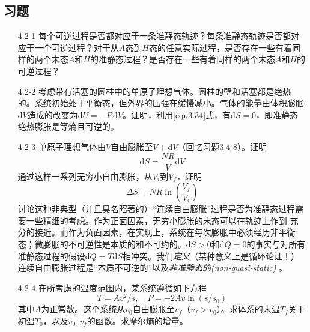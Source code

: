\subsection*{习题}
\begin{itemize}
\item[4.2-1] 每个可逆过程是否都对应于一条准静态轨迹？每条准静态轨迹是否都对应于一个可逆过程？对于从$A$态到$H$态的任意实际过程，是否存在一些有着同样的两个末态$A$和$H$的准静态过程？是否存在一些有着同样的两个末态$A$和$H$的可逆过程？
\item[4.2-2] 考虑带有活塞的圆柱中的单原子理想气体。圆柱的壁和活塞都是绝热的。系统初始处于平衡态，但外界的压强在缓慢减小。气体的能量由体积膨胀$\mathrm dV$造成的改变为$\mathrm dU=-P\,\mathrm dV$。证明，利用\eqref{equ3.34}式，有$\mathrm dS=0$，即准静态绝热膨胀是等熵且可逆的。
\item[4.2-3] 单原子理想气体由$V$自由膨胀至$V+\mathrm dV$（回忆习题3.4-8）。证明
\[
\mathrm dS = \frac{NR}{V}\mathrm dV
\]
通过这样一系列无穷小自由膨胀，从$V_i$到$V_f$，证明
\[
\Delta S = NR\ln(\frac{V_f}{V_i})
\]
讨论这种非典型（并且臭名昭著的）“连续自由膨胀”过程是否为准静态过程需要一些精细的考虑。作为正面因素，无穷小膨胀的末态可以在轨迹上作到%
%
充分的接近。而作为负面因素，在实现上，系统在每次膨胀中必须经历非平衡态；微膨胀的不可逆性是本质的和不可约的。$\mathrm dS>0$和$\mathrm dQ=0$的事实与对所有准静态过程的假设$\mathrm dQ=T\mathrm dS$相冲突。我们{\it 定义}（某种意义上是循环论证！）连续自由膨胀过程是“本质不可逆的”以及{\it 非准静态的(non-quasi-static)}%
。
\item[4.2-4] 在所考虑的温度范围内，某系统遵循如下方程
\[
T=Av^2/s, \quad P=-2Av\ln(s/s_0)
\]
其中$A$为正常数。这个系统从$v_0$自由膨胀至$v_f$（$v_f>v_0$）。求体系的末温$T_f$关于初温$T_0$，以及$v_0,v_f$的函数。求摩尔熵的增量。
\end{itemize}